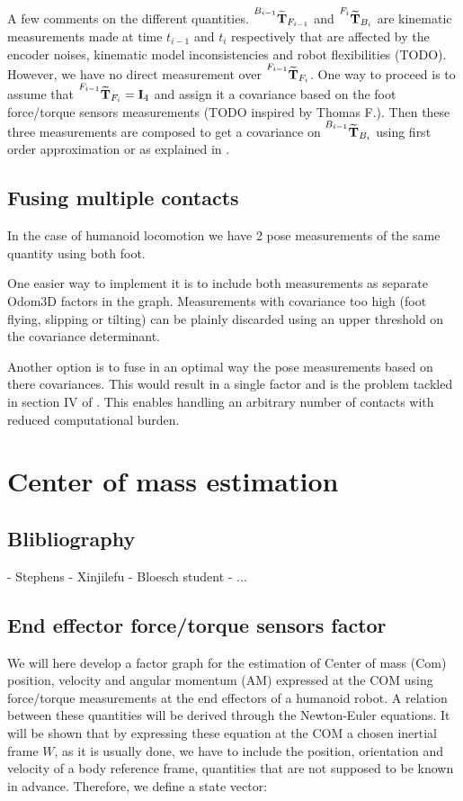 \documentclass[11pt]{article}
\newcommand{\Tm}[2]{\prescript{#1}{}{\widetilde{\bfT}}_{#2}}
\begin{document}
A few comments on the different quantities. $ \Tm{B_{i-1}}{F_{i-1}} $ and $ \Tm{F_{i}}{B_i} $ are kinematic measurements made at time $t_{i-1}$ and $t_{i}$ respectively that are affected by the encoder noises, kinematic model inconsistencies and robot flexibilities (TODO). However, we have no direct measurement over $\Tm{F_{i-1}}{F_{i}}$. One way to proceed is to assume that $\Tm{F_{i-1}}{F_{i}}=\bfI_4$ and assign it a covariance based on the foot force/torque sensors measurements (TODO inspired by Thomas F.). Then these three measurements are composed to get a covariance on $\Tm{B_{i-1}}{B_i}$ using first order approximation or as explained in \cite{barfoot2014associating}.

\subsection{Fusing multiple contacts}
In the case of humanoid locomotion we have 2 pose measurements of the same quantity using both foot. 

One easier way to implement it is to include both measurements as separate Odom3D factors in the graph. Measurements with covariance too high (foot flying, slipping or tilting) can be plainly discarded using an upper threshold on the covariance determinant.

Another option is to fuse in an optimal way the pose measurements based on there covariances. This would result in a single factor and is the problem tackled in section IV of \cite{barfoot2014associating}. This enables handling an arbitrary number of contacts with reduced computational burden.


\section{Center of mass estimation}
\subsection{Blibliography}
- Stephens
- Xinjilefu
- Bloesch student
- ...

\subsection{End effector force/torque sensors factor}
We will here develop a factor graph for the estimation of Center of mass (Com) position, velocity and angular momentum (AM) expressed at the COM using force/torque measurements at the end effectors of a humanoid robot. A relation between these quantities will be derived through the Newton-Euler equations. It will be shown that by expressing these equation at the COM a chosen inertial frame $W$, as it is usually done, we have to include the position, orientation and velocity of a body reference frame, quantities that are not supposed to be known in advance. 
Therefore, we define a state vector: 
\end{document}
